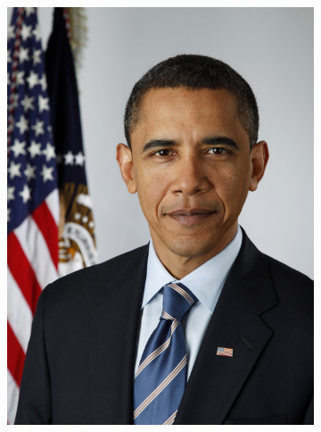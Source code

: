 \documentclass[conference]{IEEEtran}
\begin{document}
				\begin{figure}[!ht]
					\centering
					\begin{subfigure}[!ht]{0.48\linewidth}
						\centerline{\includegraphics[width=0.9\linewidth]{imgs/obama.jpg}}
						\label{fig:1a}
					\end{subfigure}
					\begin{subfigure}[!ht]{0.48\linewidth}

\end{subfigure}
\end{figure}
\end{document}
